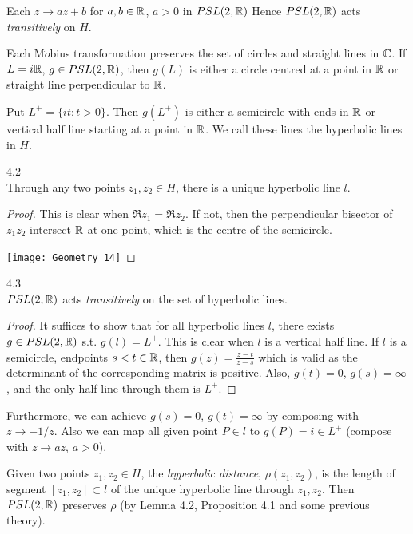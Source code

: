 \documentclass[a4paper]{article}
\begin{document}
\begin{rem}
Each $z \to az+b$ for $a,b \in \mathbb{R}$, $a>0$ in $PSL(2,\mathbb{R})$ Hence $PSL(2,\mathbb{R})$ acts \emph{transitively} on $H$.
\end{rem}
Each M$\ddot{o}$bius transformation preserves the set of circles and straight lines in $\mathbb{C}$. If $L=i\mathbb{R}$, $g \in PSL(2,\mathbb{R})$, then $g(L)$ is either a circle centred at a point in $\mathbb{R}$ or straight line perpendicular to $\mathbb{R}$.

Put $L^+ = \{it:t>0\}$. Then $g(L^+)$ is either a semicircle with ends in $\mathbb{R}$ or vertical half line starting at a point in $\mathbb{R}$. We call these lines the hyperbolic lines in $H$.

\begin{lemma} 4.2\\
Through any two points $z_1,z_2 \in H$, there is a unique hyperbolic line $l$.
\begin{proof}
This is clear when $\Re z_1 = \Re z_2$. If not, then the perpendicular bisector of $z_1z_2$ intersect $\mathbb{R}$ at one point, which is the centre of the semicircle.

\texttt{[image: Geometry\_14]}
\end{proof}
\end{lemma}

\begin{lemma} 4.3\\
$PSL(2,\mathbb{R})$ acts \emph{transitively} on the set of hyperbolic lines.
\begin{proof}
It suffices to show that for all hyperbolic lines $l$, there exists $g \in PSL(2,\mathbb{R})$ s.t. $g(l)=L^+$. This is clear when $l$ is a vertical half line. If $l$ is a semicircle, endpoints $s<t\in \mathbb{R}$, then $g(z) = \frac{z-t}{z-s}$ which is valid as the determinant of the corresponding matrix is positive. Also, $g(t) = 0$, $g(s) = \infty$, and the only half line through them is $L^+$.
\end{proof}
\end{lemma}

\begin{rem}
Furthermore, we can achieve $g(s)=0$, $g(t) = \infty$ by composing with $z \to -1/z$. Also we can map all given point $P \in l$ to $g(P) = i \in L^+$ (compose with $z \to az$, $a>0$).
\end{rem}

\begin{defi}
Given two points $z_1,z_2 \in H$, the \emph{hyperbolic distance}, $\rho(z_1,z_2)$, is the length of segment $[z_1,z_2] \subset l$ of the unique hyperbolic line through $z_1,z_2$. Then $PSL(2,\mathbb{R})$ preserves $\rho$ (by Lemma 4.2, Proposition 4.1 and some previous theory).
\end{defi}
\end{document}
